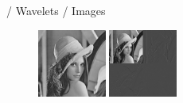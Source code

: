 \documentclass{beamer}
\def\RImageSize{0.2\textwidth}
\def\RImageSpace{\hspace{1cm}}
\begin{document}
\begin{frame}{/ Wavelets / Images}

  \begin{figure}[hbt]
    \begin{center}
      \includegraphics[width=\RImageSize]{lena512.jpg}
      \RImageSpace
      \pause
      \includegraphics[width=\RImageSize]{lena-1step.jpg}

\end{center}
\end{figure}
\end{frame}
\end{document}
